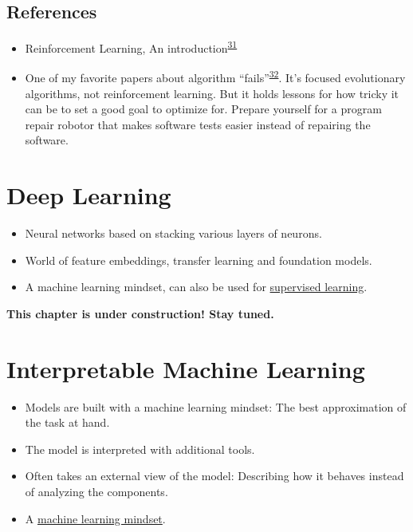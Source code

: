 \documentclass[
  10pt,
]{scrbook}
\providecommand{\tightlist}{%
  \setlength{\itemsep}{0pt}\setlength{\parskip}{0pt}}
\begin{document}
\hypertarget{references-1}{%
\section{References}\label{references-1}}

\begin{itemize}
\tightlist
\item
  Reinforcement Learning, An introduction\textsuperscript{\protect\hyperlink{ref-sutton2018reinforcement}{31}}
\item
  One of my favorite papers about algorithm ``fails''\textsuperscript{\protect\hyperlink{ref-lehman2020surprising}{32}}. It's focused evolutionary algorithms, not reinforcement learning. But it holds lessons for how tricky it can be to set a good goal to optimize for. Prepare yourself for a program repair robotor that makes software tests easier instead of repairing the software.
\end{itemize}

\hypertarget{deep-learning}{%
\chapter{Deep Learning}\label{deep-learning}}

\begin{itemize}
\tightlist
\item
  Neural networks based on stacking various layers of neurons.
\item
  World of feature embeddings, transfer learning and foundation models.
\item
  A machine learning mindset, can also be used for \protect\hyperlink{supervised-ml}{supervised learning}.
\end{itemize}

\textbf{This chapter is under construction! Stay tuned.}

\hypertarget{interpretable-ml}{%
\chapter{Interpretable Machine Learning}\label{interpretable-ml}}

\begin{itemize}
\tightlist
\item
  Models are built with a machine learning mindset: The best approximation of the task at hand.
\item
  The model is interpreted with additional tools.
\item
  Often takes an external view of the model: Describing how it behaves instead of analyzing the components.
\item
  A \protect\hyperlink{machine-learning}{machine learning mindset}.
\end{itemize}
\end{document}
